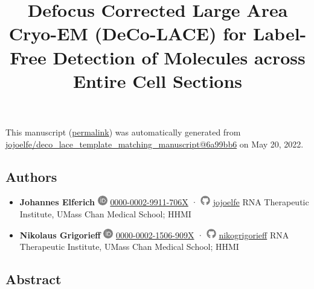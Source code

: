 \documentclass[
]{article}
\title{Defocus Corrected Large Area Cryo-EM (DeCo-LACE) for Label-Free Detection of Molecules across Entire Cell Sections}
\author{}
\date{}
\begin{document}
\maketitle

This manuscript
(\href{https://jojoelfe.github.io/deco_lace_template_matching_manuscript/v/6a99bb6d7d1ae0bbee70874ab4b79ba22f7fe1ce/}{permalink})
was automatically generated
from \href{https://github.com/jojoelfe/deco_lace_template_matching_manuscript/tree/6a99bb6d7d1ae0bbee70874ab4b79ba22f7fe1ce}{jojoelfe/deco\_lace\_template\_matching\_manuscript@6a99bb6}
on May 20, 2022.

\hypertarget{authors}{%
\subsection{Authors}\label{authors}}

\begin{itemize}
\item
  \textbf{Johannes Elferich}
  \includegraphics[width=0.16667in,height=0.16667in]{images/orcid.pdf}
  \href{https://orcid.org/0000-0002-9911-706X}{0000-0002-9911-706X}
  · \includegraphics[width=0.16667in,height=0.16667in]{images/github.pdf}
  \href{https://github.com/jojoelfe}{jojoelfe}
  RNA Therapeutic Institute, UMass Chan Medical School; HHMI
\item
  \textbf{Nikolaus Grigorieff}
  \includegraphics[width=0.16667in,height=0.16667in]{images/orcid.pdf}
  \href{https://orcid.org/0000-0002-1506-909X}{0000-0002-1506-909X}
  · \includegraphics[width=0.16667in,height=0.16667in]{images/github.pdf}
  \href{https://github.com/nikogrigorieff}{nikogrigorieff}
  RNA Therapeutic Institute, UMass Chan Medical School; HHMI
\end{itemize}

\hypertarget{abstract}{%
\subsection{Abstract}\label{abstract}}
\end{document}
